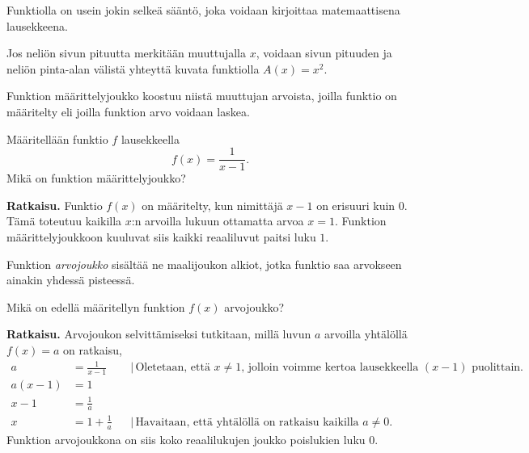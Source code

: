 Funktiolla on usein jokin selkeä sääntö, joka voidaan kirjoittaa
matemaattisena lausekkeena.

\begin{esimerkki}
Jos neliön sivun pituutta merkitään muuttujalla $x$, voidaan sivun pituuden
ja neliön pinta-alan välistä yhteyttä kuvata funktiolla
$A(x) = x^2$.
\end{esimerkki}

Funktion määrittelyjoukko koostuu niistä muuttujan arvoista, joilla
funktio on määritelty eli joilla funktion arvo voidaan laskea.

\begin{esimerkki}
Määritellään funktio $f$ lausekkeella
\[
f(x) = \frac{1}{x-1}.
\]
Mikä on funktion määrittelyjoukko?

\textbf{Ratkaisu.}
Funktio $f(x)$ on määritelty, kun nimittäjä $x-1$ on erisuuri
kuin 0. Tämä toteutuu kaikilla $x$:n arvoilla lukuun ottamatta
arvoa $x = 1$. Funktion määrittelyjoukkoon kuuluvat siis
kaikki reaaliluvut paitsi luku $1$.
\end{esimerkki}

Funktion \emph{arvojoukko} sisältää ne maalijoukon alkiot,
jotka funktio saa arvokseen ainakin yhdessä pisteessä.

\begin{esimerkki}
Mikä on edellä määritellyn funktion $f(x)$ arvojoukko?

\textbf{Ratkaisu.}
Arvojoukon selvittämiseksi tutkitaan, millä luvun $a$ arvoilla
yhtälöllä $f(x) = a$ on ratkaisu,
\begin{align*}
a &= \frac{1}{x-1} & &| \, \text{Oletetaan, että $x \neq 1$, jolloin voimme kertoa lausekkeella $(x-1)$ puolittain.} \\
a(x-1) &= 1 \\
x-1 &= \frac{1}{a} \\
x &= 1+\frac{1}{a} & &| \, \text{Havaitaan, että yhtälöllä on ratkaisu
kaikilla $a \neq 0$.}
\end{align*}
Funktion arvojoukkona on siis koko reaalilukujen joukko poislukien luku $0$.
\end{esimerkki}


